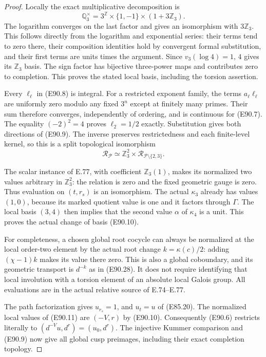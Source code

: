 \begin{proof}
Locally the exact multiplicative decomposition is
\[
       \mathbb Q_3^\times
         =3^{\mathbb Z}\times\{1,-1\}\times(1+3\mathbb Z_3).
 \tag{E90.29}
\]
The logarithm converges on the last factor
and gives an isomorphism with $3\mathbb Z_3$.
This follows directly from the logarithm and
exponential series: their terms tend to zero
there, their composition identities hold by
convergent formal substitution, and their
first terms are units times the argument.
Since $v_3(\log4)=1$, $4$ gives its
$\mathbb Z_3$ basis. The sign factor has
bijective three-power maps and contributes
zero to completion. This proves the stated
local basis, including the torsion assertion.

Every $\ell_\ell$ in (E90.8) is integral.
For a restricted exponent family, the terms
$a_\ell\ell_\ell$ are uniformly zero modulo
any fixed $3^n$ except at finitely many primes.
Their sum therefore converges, independently
of ordering, and is continuous for (E90.7).
The equality $(-2)^2=4$ proves
$\ell_2=1/2$ exactly. Substitution gives both
directions of (E90.9). The inverse preserves
restrictedness and each finite-level kernel,
so this is a split topological isomorphism
\[
 \mathscr R_{\mathcal P}\simeq
         \mathbb Z_3^2\times\mathscr R_{\mathcal P\setminus\{2,3\}}.
 \tag{E90.30}
\]

The scalar instance of E.77, with coefficient
$\mathbb Z_3(1)$, makes its normalized two
values arbitrary in $\mathbb Z_3^2$: the
relation is zero and the fixed geometric
gauge is zero. Thus evaluation on $(t,r_s)$
is an isomorphism. The actual $\kappa_3$
already has values $(1,0)$, because its
marked quotient value is one and it factors
through $\Gamma$. The local basis $(3,4)$
then implies that the second value $\alpha$
of $\kappa_4$ is a unit. This proves the
actual change of basis (E90.10).

For completeness, a chosen global root
cocycle can always be normalized at the
local order-two element by the actual root
change $k=\kappa(c)/2$: adding
$(\chi-1)k$ makes its value there zero.
This is also a global coboundary, and its
geometric transport is $d^{-k}$ as in
(E90.28). It does not require identifying
that local involution with a torsion
element of an absolute local Galois group.
All evaluations are in the actual relative
source of E.74--E.77.

The path factorization gives $u_{r_s}=1$,
and $u_t=u$ of (E85.20). The normalized
local values of (E90.11) are $(-V,r)$ by
(E90.10). Consequently (E90.6) restricts
literally to $(d^{-V}u,d^r)=(u_0,d^r)$.
The injective Kummer comparison and
(E90.9) now give all global cusp preimages,
including their exact completion topology.


\end{proof}
